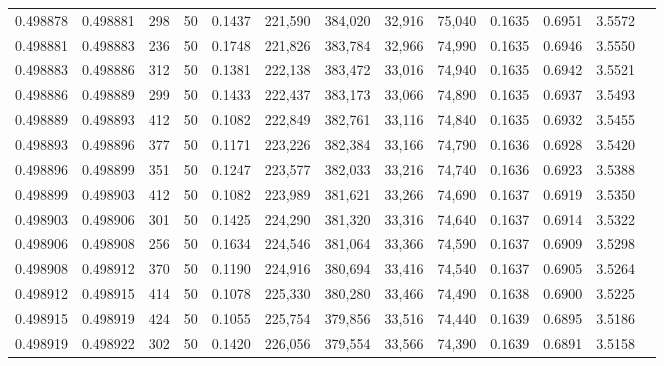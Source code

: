 \begin{tabular}{rrrrrrrrrrrrr}
0.498878 & 0.498881 & 298 &  50 &                                     0.1437 & 221,590 & 384,020 &  32,916 &  75,040 & 0.1635 & 0.6951 & 3.5572 \\
0.498881 & 0.498883 & 236 &  50 &                                     0.1748 & 221,826 & 383,784 &  32,966 &  74,990 & 0.1635 & 0.6946 & 3.5550 \\
0.498883 & 0.498886 & 312 &  50 &                                     0.1381 & 222,138 & 383,472 &  33,016 &  74,940 & 0.1635 & 0.6942 & 3.5521 \\
0.498886 & 0.498889 & 299 &  50 &                                     0.1433 & 222,437 & 383,173 &  33,066 &  74,890 & 0.1635 & 0.6937 & 3.5493 \\
0.498889 & 0.498893 & 412 &  50 &                                     0.1082 & 222,849 & 382,761 &  33,116 &  74,840 & 0.1635 & 0.6932 & 3.5455 \\
0.498893 & 0.498896 & 377 &  50 &                                     0.1171 & 223,226 & 382,384 &  33,166 &  74,790 & 0.1636 & 0.6928 & 3.5420 \\
0.498896 & 0.498899 & 351 &  50 &                                     0.1247 & 223,577 & 382,033 &  33,216 &  74,740 & 0.1636 & 0.6923 & 3.5388 \\
0.498899 & 0.498903 & 412 &  50 &                                     0.1082 & 223,989 & 381,621 &  33,266 &  74,690 & 0.1637 & 0.6919 & 3.5350 \\
0.498903 & 0.498906 & 301 &  50 &                                     0.1425 & 224,290 & 381,320 &  33,316 &  74,640 & 0.1637 & 0.6914 & 3.5322 \\
0.498906 & 0.498908 & 256 &  50 &                                     0.1634 & 224,546 & 381,064 &  33,366 &  74,590 & 0.1637 & 0.6909 & 3.5298 \\
0.498908 & 0.498912 & 370 &  50 &                                     0.1190 & 224,916 & 380,694 &  33,416 &  74,540 & 0.1637 & 0.6905 & 3.5264 \\
0.498912 & 0.498915 & 414 &  50 &                                     0.1078 & 225,330 & 380,280 &  33,466 &  74,490 & 0.1638 & 0.6900 & 3.5225 \\
0.498915 & 0.498919 & 424 &  50 &                                     0.1055 & 225,754 & 379,856 &  33,516 &  74,440 & 0.1639 & 0.6895 & 3.5186 \\
0.498919 & 0.498922 & 302 &  50 &                                     0.1420 & 226,056 & 379,554 &  33,566 &  74,390 & 0.1639 & 0.6891 & 3.5158 \\

\end{tabular}
